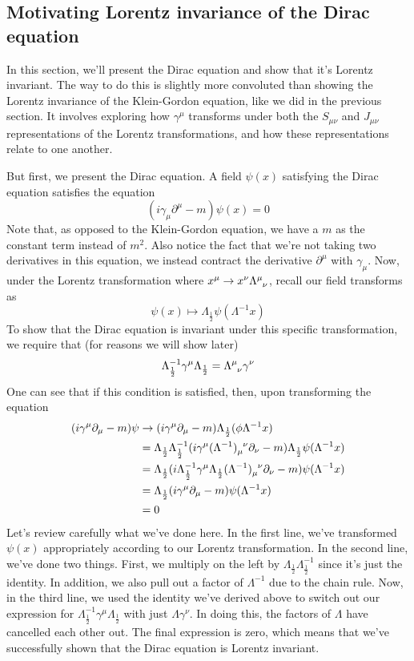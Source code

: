 \subsection{Motivating Lorentz invariance of the Dirac equation}
In this section, we'll present the Dirac equation and show that it's Lorentz invariant. The way to do this is slightly more convoluted than showing the Lorentz invariance of the Klein-Gordon equation, like we did in the previous section. It involves exploring how $\gamma^\mu$ transforms under both the $S_{ \mu \nu } $ and $ J_{ \mu \nu} $ representations of the Lorentz transformations, and how these representations relate to one another. 

But first, we present the Dirac equation. A field $\psi(x)$ satisfying the Dirac equation satisfies the equation \[ ( i \gamma_\mu \partial^\mu  - m ) \psi( x) = 0  \]
Note that, as opposed to the Klein-Gordon equation, we have a $m$ as the constant term instead of $m^2$. Also notice the fact that we're not taking two derivatives in this equation, we instead contract the derivative $\partial^\mu$ with $\gamma_\mu$. Now, under the Lorentz transformation where $x^\mu \rightarrow x^\nu \Lambda\indices{^\mu_\nu} $, recall our field transforms as \[ 
\psi(x)  \mapsto \Lambda_{ \frac{ 1 }{2 }} \psi( \Lambda^{ -1} x ) \] 
To show that the Dirac equation is invariant under this specific transformation, we require that (for reasons we will show later) \[ 
\Lambda_{ \frac{ 1}{ 2}}^{ -1} \gamma^\mu \Lambda_{ \frac{ 1}{2}}  = \Lambda\indices{ ^\mu_\nu } \gamma^\nu \] 
One can see that if this condition is satisfied, then, upon transforming the equation
\begin{align*} 
( i \gamma^\mu \partial_\mu  -m) \psi & \rightarrow ( i \gamma^\mu \partial_\mu  - m) \Lambda_{ \frac{ 1}{2} } ( \phi \Lambda^{ -1} x )  \\ 
& = \Lambda_{ \frac{1}{ 2} } \Lambda_{ \frac{1}{2} }^{ -1}  ( i \gamma^\mu ( \Lambda^{-1 })\indices{_\mu^\nu} \partial_\nu  - m ) \Lambda_{ \frac{ 1}{2} } \psi( \Lambda^{-1} x ) \\ 
& = \Lambda_{ \frac{ 1}{ 2} } ( i \Lambda_{ \frac{ 1}{2}}^{ -1} \gamma^\mu \Lambda_{ \frac{ 1}{2} } ( \Lambda^{ -1} )\indices{_\mu^\nu} \partial_\nu - m ) \psi( \Lambda^{ -1} x) \\
&= \Lambda_{ \frac{ 1}{2}} ( i \gamma^\mu \partial_\mu  -m ) \psi( \Lambda^{-1} x)    \\ 
&= 0  
\end{align*} 
Let's review carefully what we've done here. In the first line, we've transformed $\psi( x) $ appropriately according to our Lorentz transformation. In the second line, we've done two things. First, we multiply on the left by $\Lambda_{ \frac{1}{2}} \Lambda_{\frac{1}{2}}^{ -1} $ since it's just the identity. In addition, we also pull out a factor of $\Lambda^{-1} $ due to the chain rule. Now, in the third line, we used the identity we've derived above to switch out our expression for $\Lambda_{ \frac{ 1}{2}}^{ -1}  \gamma^\mu \Lambda_{ \frac{1}{2} } $ with just $\Lambda \gamma^\nu $. In doing this, the factors of $\Lambda $ have cancelled each other out. 
The final expression is zero, which means that we've successfully shown that the Dirac equation is Lorentz invariant. 

